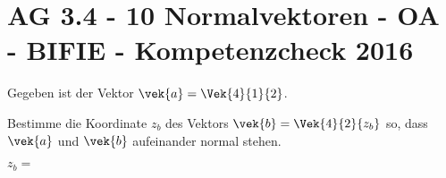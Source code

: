 \section{AG 3.4 - 10 Normalvektoren - OA - BIFIE - Kompetenzcheck 2016}

\begin{beispiel}[AG 3.4]{1} %
				Gegeben ist der Vektor $\vek{a}=\Vek{4}{1}{2}$.

Bestimme die Koordinate $z_{b}$ des Vektors $\vek{b}=\Vek{4}{2}{z_{b}}$ so, dass $\vek{a}$ und $\vek{b}$ aufeinander normal stehen.\leer

$z_{b}=$ 
\end{beispiel}	